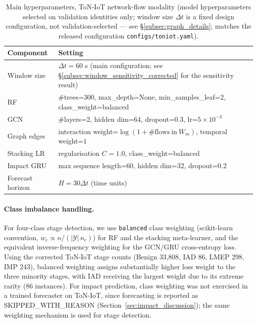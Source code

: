 \documentclass[pdflatex,sn-mathphys-num]{sn-jnl}
\theoremstyle{thmstyleone}%
\theoremstyle{thmstyletwo}%
\theoremstyle{thmstylethree}%
\begin{document}
\begin{table}[!t]
\centering
\caption{Main hyperparameters, ToN-IoT network-flow modality (model hyperparameters selected on validation identities only; window size $\Delta t$ is a fixed design configuration, not validation-selected --- see \S\ref{subsec:graph_details}; matches the released configuration \texttt{configs/toniot.yaml}).}
\label{tab:main_hparams}
\renewcommand{\arraystretch}{1.12}
\begin{tabular}{p{4cm} p{7cm}}
\toprule
\textbf{Component} & \textbf{Setting} \\
\midrule
Window size & $\Delta t=60$ s (main configuration; see \S\ref{subsec:window_sensitivity_corrected} for the sensitivity result) \\
RF & \#trees=300, max\_depth=None, min\_samples\_leaf=2, class\_weight=balanced \\
GCN & \#layers=2, hidden dim=64, dropout=0.3, lr=$5\times10^{-3}$ \\
Graph edges & interaction weight=$\log(1+\#\mathrm{flows\ in}\ W_m)$, temporal weight=$1$ \\
Stacking LR & regularisation $C=1.0$, class\_weight=balanced \\
Impact GRU & max sequence length=60, hidden dim=32, dropout=0.2 \\
Forecast horizon & $H=30\Delta t$ (time units) \\
\bottomrule
\end{tabular}
\end{table}


\paragraph{Class imbalance handling.}
For four-class stage detection, we use \texttt{balanced} class weighting (scikit-learn convention, $w_c \propto n/(|\mathcal{Y}|\, n_c)$) for RF and the stacking meta-learner, and the equivalent inverse-frequency weighting for the GCN/GRU cross-entropy loss. Using the corrected ToN-IoT stage counts (Benign 33{,}808, IAD 86, LMEP 298, IMP 243), balanced weighting assigns substantially higher loss weight to the three minority stages, with IAD receiving the largest weight due to its extreme rarity (86 instances). For impact prediction, class weighting was not exercised in a trained forecaster on ToN-IoT, since forecasting is reported as SKIPPED\_WITH\_REASON (Section~\ref{sec:impact_discussion}); the same weighting mechanism is used for stage detection.
\end{document}
